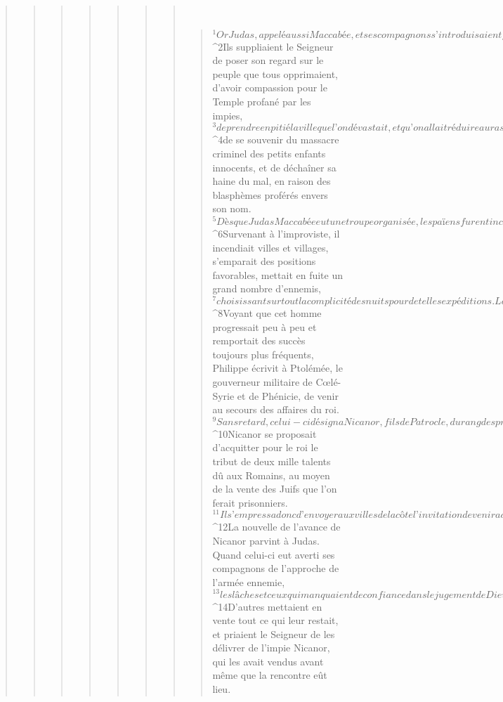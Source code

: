 \begin{verse}
\begin{verse}
\begin{verse}
\begin{verse}
\begin{verse}
\begin{verse}
\begin{verse}
         
      \bchapter{}
      \begin{verse}
${}^{1}Or Judas, appelé aussi Maccabée, et ses compagnons s’introduisaient furtivement dans les villages et faisaient appel à leurs frères de race. Réunissant ceux qui demeuraient fidèles au judaïsme, ils en rassemblèrent environ six mille. 
${}^{2}Ils suppliaient le Seigneur de poser son regard sur le peuple que tous opprimaient, d’avoir compassion pour le Temple profané par les impies, 
${}^{3}de prendre en pitié la ville que l’on dévastait, et qu’on allait réduire au ras du sol. Ils le suppliaient d’écouter le sang qui criait jusqu’à lui, 
${}^{4}de se souvenir du massacre criminel des petits enfants innocents, et de déchaîner sa haine du mal, en raison des blasphèmes proférés envers son nom. 
${}^{5}Dès que Judas Maccabée eut une troupe organisée, les païens furent incapables de lui résister, car la colère du Seigneur s’était changée en miséricorde. 
${}^{6}Survenant à l’improviste, il incendiait villes et villages, s’emparait des positions favorables, mettait en fuite un grand nombre d’ennemis, 
${}^{7}choisissant surtout la complicité des nuits pour de telles expéditions. La renommée de sa bravoure se répandait partout.
${}^{8}Voyant que cet homme progressait peu à peu et remportait des succès toujours plus fréquents, Philippe écrivit à Ptolémée, le gouverneur militaire de Cœlé-Syrie et de Phénicie, de venir au secours des affaires du roi. 
${}^{9}Sans retard, celui-ci désigna Nicanor, fils de Patrocle, du rang des premiers amis du roi, et l’envoya, à la tête d’au moins vingt mille hommes de diverses nations, pour exterminer la race juive tout entière. Il lui adjoignit Gorgias, un général qui avait l’expérience des choses de la guerre. 
${}^{10}Nicanor se proposait d’acquitter pour le roi le tribut de deux mille talents dû aux Romains, au moyen de la vente des Juifs que l’on ferait prisonniers. 
${}^{11}Il s’empressa donc d’envoyer aux villes de la côte l’invitation de venir acheter des esclaves juifs, promettant d’en livrer quatre-vingt-dix pour un talent ; il ne s’attendait pas au jugement qui devait s’ensuivre pour lui, de la part du Tout-Puissant.
${}^{12}La nouvelle de l’avance de Nicanor parvint à Judas. Quand celui-ci eut averti ses compagnons de l’approche de l’armée ennemie, 
${}^{13}les lâches et ceux qui manquaient de confiance dans le jugement de Dieu s’enfuirent de tous côtés et gagnèrent d’autres lieux. 
${}^{14}D’autres mettaient en vente tout ce qui leur restait, et priaient le Seigneur de les délivrer de l’impie Nicanor, qui les avait vendus avant même que la rencontre eût lieu. 

\end{verse}
\end{verse}
\end{verse}
\end{verse}
\end{verse}
\end{verse}
\end{verse}
\end{verse}
